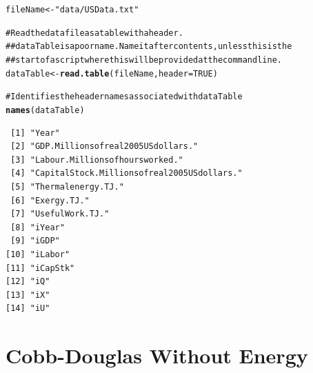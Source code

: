 \documentclass[preprint,authoryear,12pt]{elsarticle}\usepackage{graphicx, color}
\makeatletter
\newcommand{\hlfunctioncall}[1]{\textcolor[rgb]{0.501960784313725,0,0.329411764705882}{\textbf{#1}}}%
\newcommand{\hlstring}[1]{\textcolor[rgb]{0.6,0.6,1}{#1}}%
\newcommand{\hlcomment}[1]{\textcolor[rgb]{0.180392156862745,0.6,0.341176470588235}{#1}}%
\newenvironment{kframe}{%
 \def\at@end@of@kframe{}%
 \ifinner\ifhmode%
  \def\at@end@of@kframe{\end{minipage}}%
  \begin{minipage}{\columnwidth}%
 \fi\fi%
 \def\FrameCommand##1{\hskip\@totalleftmargin \hskip-\fboxsep
 \colorbox{shadecolor}{##1}\hskip-\fboxsep
     \hskip-\linewidth \hskip-\@totalleftmargin \hskip\columnwidth}%
 \MakeFramed {\advance\hsize-\width
   \@totalleftmargin\z@ \linewidth\hsize
   \@setminipage}}%
 {\par\unskip\endMakeFramed%
 \at@end@of@kframe}
\newenvironment{knitrout}{}{} %
\makeatother
\begin{document}
\begin{knitrout}
\color{fgcolor}\begin{kframe}
\begin{alltt}
fileName <- \hlstring{"data/USData.txt"}

\hlcomment{# Read the data file as a table with a header.  }
\hlcomment{## dataTable is a poor name.  Name it after contents, unless this is the }
\hlcomment{## start of a script where this will be provided at the command line.}
dataTable <- \hlfunctioncall{read.table}(fileName, header = TRUE)

\hlcomment{# Identifies the header names associated with dataTable}
\hlfunctioncall{names}(dataTable)
\end{alltt}
\begin{verbatim}
 [1] "Year"                                     
 [2] "GDP.Millionsofreal2005USdollars."         
 [3] "Labour.Millionsofhoursworked."            
 [4] "CapitalStock.Millionsofreal2005USdollars."
 [5] "Thermalenergy.TJ."                        
 [6] "Exergy.TJ."                               
 [7] "UsefulWork.TJ."                           
 [8] "iYear"                                    
 [9] "iGDP"                                     
[10] "iLabor"                                   
[11] "iCapStk"                                  
[12] "iQ"                                       
[13] "iX"                                       
[14] "iU"                                       
\end{verbatim}
\end{kframe}
\end{knitrout}


\section{Cobb-Douglas Without Energy}
\end{document}
